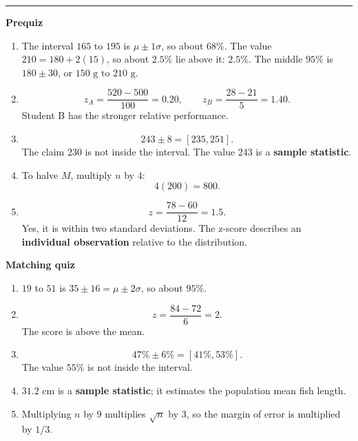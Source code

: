 \documentclass[10pt]{article}
\newcommand{\modulekey}[2]{\clearpage{\Large\bfseries\textcolor{olive}{Module #1: #2 — Answer Key}}\par\textcolor{gold}{\rule{\linewidth}{1.2pt}}\par}
\begin{document}
\modulekey{4}{Intermediate Statistics and Inference}
\textbf{Prequiz}
\begin{enumerate}
\item The interval \(165\) to \(195\) is \(\mu\pm1\sigma\), so about \(\boxed{68\%}\). The value \(210=180+2(15)\), so about \(2.5\%\) lie above it: \(\boxed{2.5\%}\). The middle \(95\%\) is \(180\pm30\), or \(\boxed{150\text{ g to }210\text{ g}}\).
\item
\[
z_A=\frac{520-500}{100}=\boxed{0.20},\qquad z_B=\frac{28-21}{5}=\boxed{1.40}.
\]
Student B has the stronger relative performance.
\item
\[
243\pm8=[\boxed{235},\boxed{251}].
\]
The claim \(230\) is not inside the interval. The value \(243\) is a \textbf{sample statistic}.
\item To halve \(M\), multiply \(n\) by \(4\):
\[
4(200)=\boxed{800}.
\]
\item
\[
z=\frac{78-60}{12}=\boxed{1.5}.
\]
Yes, it is within two standard deviations. The z-score describes an \textbf{individual observation} relative to the distribution.
\end{enumerate}

\textbf{Matching quiz}
\begin{enumerate}
\item \(19\) to \(51\) is \(35\pm16=\mu\pm2\sigma\), so about \(\boxed{95\%}\).
\item
\[
z=\frac{84-72}{6}=\boxed2.
\]
The score is above the mean.
\item
\[
47\%\pm6\%=[\boxed{41\%},\boxed{53\%}].
\]
The value \(55\%\) is not inside the interval.
\item \(31.2\) cm is a \textbf{sample statistic}; it estimates the population mean fish length.
\item Multiplying \(n\) by \(9\) multiplies \(\sqrt n\) by \(3\), so the margin of error is multiplied by \(\boxed{1/3}\).
\end{enumerate}
\end{document}
